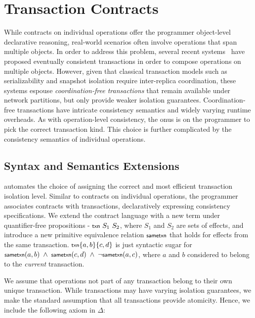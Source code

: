 \section{Transaction Contracts}
\label{sec:txns}

While contracts on individual operations offer the programmer object-level
declarative reasoning, real-world scenarios often involve operations that span
multiple objects. In order to address this problem, several recent
systems~\cite{Walter,Burckhardt2012,BailisHAT} have proposed eventually
consistent transactions in order to compose operations on multiple objects.
However, given that classical transaction models such as serializability and
snapshot isolation require inter-replica coordination, these systems espouse
\emph{coordination-free transactions} that remain available under network
partitions, but only provide weaker isolation guarantees. Coordination-free
transactions have intricate consistency semantics and widely varying runtime
overheads. As with operation-level consistency, the onus is on the programmer
to pick the correct transaction kind. This choice is further complicated by
the consistency semantics of individual operations.

\subsection{Syntax and Semantics Extensions}
\label{sec:syn_sem_ext}

\name automates the choice of assigning the correct and most efficient
transaction isolation level. Similar to contracts on individual operations, the
programmer associates contracts with transactions, declaratively expressing 
consistency specifications. We extend the contract language with a new term
under quantifier-free propositions - ${\small \txnZ}~S_1~S_2$, where $S_1$ and
$S_2$ are sets of effects, and introduce a new primitive equivalence relation
$\small \sametxnZ$ that holds for effects from the same transaction. $\small
\txn{a,b}{c,d}$ is just syntactic sugar for $\small \sametxn{a}{b} ~\wedge~
\sametxn{c}{d} ~\wedge~ \neg\sametxn{a}{c}$, where $a$ and $b$ considered to
belong to the \emph{current} transaction.

We assume that operations not part of any transaction belong to their own
unique transaction. While transactions may have varying isolation guarantees,
we make the standard assumption that all transactions provide atomicity. Hence,
we include the following axiom in $\Delta$:

